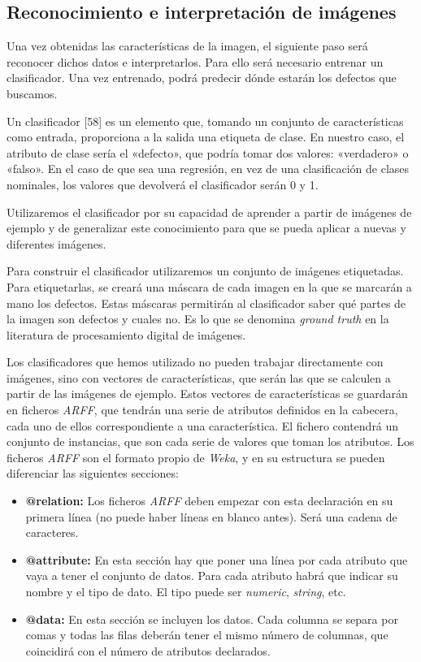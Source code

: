 \subsection{Reconocimiento e interpretación de imágenes}\label{reconocimiento}
Una vez obtenidas las características de la imagen, el siguiente paso será reconocer dichos datos e interpretarlos. Para ello será necesario entrenar un clasificador. Una vez entrenado, podrá predecir dónde estarán los defectos que buscamos.

Un clasificador [58] es un elemento que, tomando un conjunto de características como entrada, proporciona a la salida una etiqueta de clase. En nuestro caso, el atributo de clase sería el «defecto», que podría tomar dos valores: «verdadero» o «falso». En el caso de que sea una regresión, en vez de una clasificación de clases nominales, los valores que devolverá el clasificador serán 0 y 1.

Utilizaremos el clasificador por su capacidad de aprender a partir de imágenes de ejemplo y de generalizar este conocimiento para que se pueda aplicar a nuevas y diferentes imágenes.

Para construir el clasificador utilizaremos un conjunto de imágenes etiquetadas. Para etiquetarlas, se creará una máscara de cada imagen en la que se marcarán a mano los defectos. Estas máscaras permitirán al clasificador saber qué partes de la imagen son defectos y cuales no.  Es lo que se denomina \emph{ground truth} en la literatura de procesamiento digital de imágenes.

Los clasificadores que hemos utilizado no pueden trabajar directamente con imágenes, sino con vectores de características, que serán las que se calculen a partir de las imágenes de ejemplo. Estos vectores de características se guardarán en ficheros \textit{ARFF}, que tendrán una serie de atributos definidos en la cabecera, cada uno de ellos correspondiente a una característica. El fichero contendrá un conjunto de instancias, que son cada serie de valores que toman los atributos. Los ficheros \textit{ARFF} son el formato propio de \textit{Weka}, y en su estructura se pueden diferenciar las siguientes secciones:

\begin{itemize}
\item \textbf{@relation:} Los ficheros \textit{ARFF} deben empezar con esta declaración en su primera línea (no puede haber líneas en blanco antes). Será una cadena de caracteres.

\item \textbf{@attribute:} En esta sección hay que poner una línea por cada atributo que vaya a tener el conjunto de datos. Para cada atributo habrá que indicar su nombre y el tipo de dato. El tipo puede ser \emph{numeric}, \emph{string}, etc.

\item \textbf{@data:} En esta sección se incluyen los datos. Cada columna se separa por comas y todas las
filas deberán tener el mismo número de columnas, que coincidirá con el número de atributos declarados.
\end{itemize}

